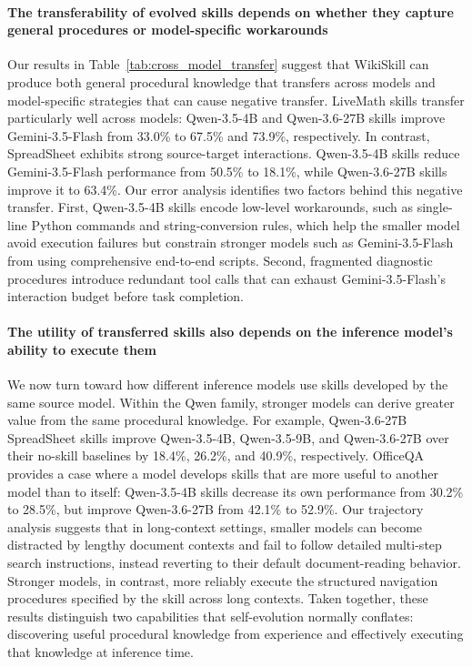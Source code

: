 \documentclass[11pt, a4paper, copyright, gr]{google}
\newcommand{\method}{WikiSkill\xspace}
\begin{document}
\paragraph{The transferability of evolved skills depends on whether they capture general procedures or model-specific workarounds} Our results in Table~\ref{tab:cross_model_transfer} suggest that \method can produce both general procedural knowledge that transfers across models and model-specific strategies that can cause negative transfer. LiveMath skills transfer particularly well across models: Qwen-3.5-4B and Qwen-3.6-27B skills improve Gemini-3.5-Flash from 33.0\% to 67.5\% and 73.9\%, respectively. In contrast, SpreadSheet exhibits strong source-target interactions. Qwen-3.5-4B skills reduce Gemini-3.5-Flash performance from 50.5\% to 18.1\%, while Qwen-3.6-27B skills improve it to 63.4\%. Our error analysis identifies two factors behind this negative transfer. First, Qwen-3.5-4B skills encode low-level workarounds, such as single-line Python commands and string-conversion rules, which help the smaller model avoid execution failures but constrain stronger models such as Gemini-3.5-Flash from using comprehensive end-to-end scripts. Second, fragmented diagnostic procedures introduce redundant tool calls that can exhaust Gemini-3.5-Flash's interaction budget before task completion.


\paragraph{The utility of transferred skills also depends on the inference model's ability to execute them} We now turn toward how different inference models use skills developed by the same source model. Within the Qwen family, stronger models can derive greater value from the same procedural knowledge. For example, Qwen-3.6-27B SpreadSheet skills improve Qwen-3.5-4B, Qwen-3.5-9B, and Qwen-3.6-27B over their no-skill baselines by 18.4\%, 26.2\%, and 40.9\%, respectively. OfficeQA provides a case where a model develops skills that are more useful to another model than to itself: Qwen-3.5-4B skills decrease its own performance from 30.2\% to 28.5\%, but improve Qwen-3.6-27B from 42.1\% to 52.9\%. Our trajectory analysis suggests that in long-context settings, smaller models can become distracted by lengthy document contexts and fail to follow detailed multi-step search instructions, instead reverting to their default document-reading behavior. Stronger models, in contrast, more reliably execute the structured navigation procedures specified by the skill across long contexts. Taken together, these results distinguish two capabilities that self-evolution normally conflates: discovering useful procedural knowledge from experience and effectively executing that knowledge at inference time.
\end{document}
